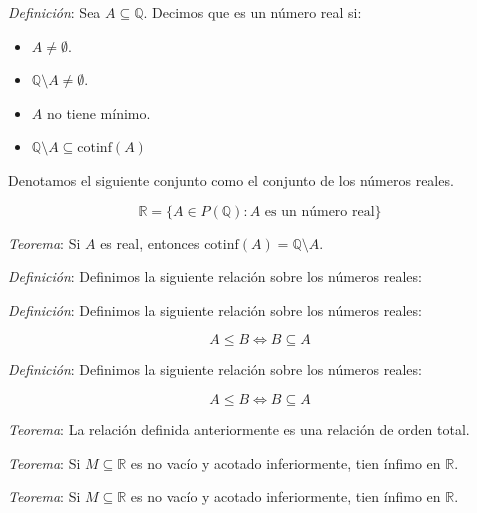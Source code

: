 \documentclass{beamer}
\newcommand{\cinf}[1]{\text{cotinf}(#1)}
\begin{document}
  \begin{frame}
    \textit{Definición}: Sea $A \subseteq \mathbb{Q}$. Decimos que es un número real si:

    \begin{itemize}
      \item $A \neq \emptyset$.
      \item $\mathbb{Q}\setminus A \neq \emptyset$.
      \item $A$ no tiene mínimo.
      \item $\mathbb{Q}\setminus A \subseteq \cinf{A}$
    \end{itemize}


    Denotamos el siguiente conjunto como el conjunto de los números reales.

    \[\mathbb{R} = \{A \in P(\mathbb{Q}): A \text{ es un número real}\}\]
  \end{frame}

  \begin{frame}
    
    \textit{Teorema}: Si $A$ es real, entonces $\cinf{A} = \mathbb{Q} \setminus A$.
  \end{frame}

  \begin{frame}
    \textit{Definición}: Definimos la siguiente relación sobre los números reales:
  \end{frame}

  \begin{frame}
    \textit{Definición}: Definimos la siguiente relación sobre los números reales:

    \[A \leq B \iff B \subseteq A\]
  \end{frame}

  \begin{frame}
    \textit{Definición}: Definimos la siguiente relación sobre los números reales:

    \[A \leq B \iff B \subseteq A\]

    \textit{Teorema}: La relación definida anteriormente es una relación de orden 
    total.
  \end{frame}

  \begin{frame}
    \textit{Teorema}: Si $M \subseteq \mathbb{R}$ es no vacío y acotado inferiormente, 
    tien ínfimo en $\mathbb{R}$.
  \end{frame}

  \begin{frame}
    \textit{Teorema}: Si $M \subseteq \mathbb{R}$ es no vacío y acotado inferiormente, 
    tien ínfimo en $\mathbb{R}$.
  \end{frame}
\end{document}
